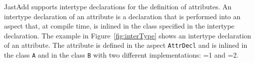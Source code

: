 JastAdd supports intertype declarations for the definition of attributes. An intertype declaration
of an attribute is a declaration that is performed into an aspect that, at compile time, 
is inlined in the class specified in the intertype declaration. The example in Figure~\ref{fig:interType}
shows an intertype declaration of an attribute. The attribute  is defined in the aspect
\texttt{AttrDecl} and is inlined in the class \texttt{A} and in the class \texttt{B} with two
different implementations: =1 and =2.


